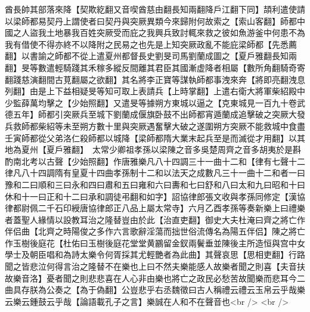酋長帥其部落來降【契欺紇翻又音喫酋慈由翻長知兩翻降戶江翻下同】頡利遣使請以梁師都易契丹上謂使者曰契丹與突厥異類今來歸附何故索之【索山客翻】師都中國之人盜我土地暴我百姓突厥受而庇之我興兵致討輒來救之彼如魚游釜中何患不為我有借使不得亦終不以降附之民易之也先是上知突厥政亂不能庇梁師都【先悉薦翻】以書諭之師都不從上遣夏州都督長史劉旻司馬劉蘭成圖之【夏戶雅翻長知兩翻】旻等數遣輕騎踐其禾稼多縱反間離其君臣其國漸虚降者相屬【數所角翻騎奇寄翻踐慈演翻間古莧翻屬之欲翻】其名將李正寶等謀執師都事洩來奔【將即亮翻洩息列翻】由是上下益相疑旻等知可取上表請兵【上時掌翻】上遣右衛大將軍柴紹殿中少監薛萬均擊之【少始照翻】又遣旻等據朔方東城以逼之【克東城見一百九十卷武德五年】師都引突厥兵至城下劉蘭成偃旗卧鼓不出師都宵遁蘭成追擊破之突厥大發兵救師都柴紹等未至朔方數十里與突厥遇奮擊大破之遂圍朔方突厥不能救城中食盡壬寅師都從父弟洛仁殺師都以城降【梁師都隋大業末起兵至是而滅從才用翻】以其地為夏州【夏戶雅翻】　太常少卿祖孝孫以梁陳之音多吳楚周齊之音多胡夷於是斟酌南北考以古聲【少始照翻】作唐雅樂凡八十四調三十一曲十二和【律有七聲十二律凡八十四調隋有皇夏十四曲孝孫制十二和以法天之成數凡三十一曲十二和者一曰豫和二曰順和三曰永和四曰肅和五曰雍和六曰夀和七曰舒和八曰太和九曰昭和十曰休和十一曰正和十二曰承和調徒弔翻和如字】詔協律郎張文收與孝孫同修定【漢協律都尉佩二千石印綬唐協律郎正八品上屬太常寺】六月乙酉孝孫等奏新樂上曰禮樂者蓋聖人緣情以設教耳治之隆替豈由於此【治直吏翻】御史大夫杜淹曰齊之將亡作伴侣曲【北齊之時陽俊之多作六言歌辭淫蕩而拙世俗流傳名為陽五伴侣】陳之將亡作玉樹後庭花【杜佑曰玉樹後庭花堂堂黄鸝留金釵兩鬢垂並陳後主所造恒與宫中女學士及朝臣唱和為詩太樂令何胥採其尤輕艷者為此曲】其聲哀思【思相吏翻】行路聞之皆悲泣何得言治之隆替不在樂也上曰不然夫樂能感人故樂者聞之則喜【夫音扶故樂音洛】憂者聞之則悲悲喜在人心非由樂也將亡之政民必愁苦故聞樂而悲耳今二曲具存朕為公奏之【為于偽翻】公豈悲乎右丞魏徵曰古人稱禮云禮云玉帛云乎哉樂云樂云鍾鼓云乎哉【論語載孔子之言】樂誠在人和不在聲音也<br />
<br />
